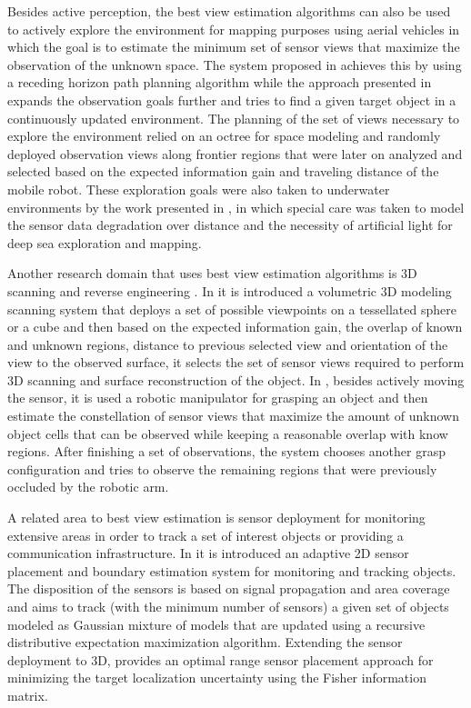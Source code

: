 Besides active perception, the best view estimation algorithms can also be used to actively explore the environment for mapping purposes using aerial vehicles in which the goal is to estimate the minimum set of sensor views that maximize the observation of the unknown space. The system proposed in \cite{Bircher2016} achieves this by using a receding horizon path planning algorithm while the approach presented in \cite{Gedicke2016} expands the observation goals further and tries to find a given target object in a continuously updated environment. The planning of the set of views necessary to explore the environment relied on an octree for space modeling and randomly deployed observation views along frontier regions that were later on analyzed and selected based on the expected information gain and traveling distance of the mobile robot. These exploration goals were also taken to underwater environments by the work presented in \cite{Sheinin2016}, in which special care was taken to model the sensor data degradation over distance and the necessity of artificial light for deep sea exploration and mapping.

Another research domain that uses best view estimation algorithms is 3D scanning and reverse engineering \cite{Jubert2021}. In \cite{Irving2014} it is introduced a volumetric 3D modeling scanning system that deploys a set of possible viewpoints on a tessellated sphere or a cube and then based on the expected information gain, the overlap of known and unknown regions, distance to previous selected view and orientation of the view to the observed surface, it selects the set of sensor views required to perform 3D scanning and surface reconstruction of the object.
In \cite{Krainin2011}, besides actively moving the sensor, it is used a robotic manipulator for grasping an object and then estimate the constellation of sensor views that maximize the amount of unknown object cells that can be observed while keeping a reasonable overlap with know regions. After finishing a set of observations, the system chooses another grasp configuration and tries to observe the remaining regions that were previously occluded by the robotic arm.

A related area to best view estimation is sensor deployment for monitoring extensive areas in order to track a set of interest objects or providing a communication infrastructure. In \cite{Guo2008} it is introduced an adaptive 2D sensor placement and boundary estimation system for monitoring and tracking objects. The disposition of the sensors is based on signal propagation and area coverage and aims to track (with the minimum number of sensors) a given set of objects modeled as Gaussian mixture of models that are updated using a recursive distributive expectation maximization algorithm. Extending the sensor deployment to 3D, \cite{Zhao2013} provides an optimal range sensor placement approach for minimizing the target localization uncertainty using the Fisher information matrix.%

